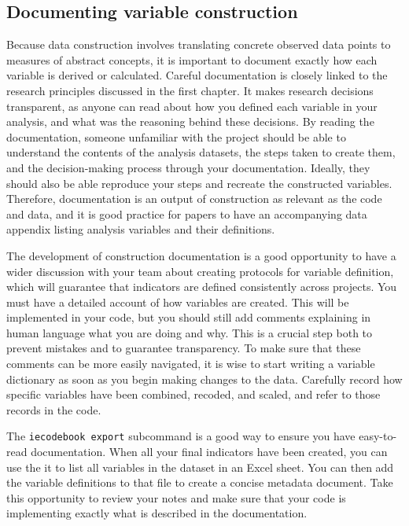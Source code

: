 \subsection{Documenting variable construction}

Because data construction involves translating concrete observed data points
to measures of abstract concepts,
it is important to document exactly how each variable is derived or calculated.
Careful documentation is closely linked to the research principles discussed in the first chapter.
It makes research decisions transparent,
as anyone can read about how you defined each variable in your analysis,
and what was the reasoning behind these decisions.
By reading the documentation,
someone unfamiliar with the project should be able to understand the contents of the analysis datasets,
the steps taken to create them, and the decision-making process through your documentation.
Ideally, they should also be able reproduce your steps and recreate the constructed variables.
Therefore, documentation is an output of construction as relevant as the code and data,
and it is good practice for papers to have an accompanying data appendix
listing analysis variables and their definitions.

The development of construction documentation is a good opportunity to have
a wider discussion with your team about creating protocols for variable definition,
which will guarantee that indicators are defined consistently across projects.
You must have a detailed account of how variables are created.
This will be implemented in your code, but you should still
add comments explaining in human language what you are doing and why.
This is a crucial step both to prevent mistakes and to guarantee transparency.
To make sure that these comments can be more easily navigated,
it is wise to start writing a variable dictionary as soon as you begin making changes to the data.
Carefully record how specific variables have been combined, recoded, and scaled,
and refer to those records in the code.

The \texttt{iecodebook export} subcommand is
a good way to ensure you have easy-to-read documentation.
When all your final indicators have been created,
you can use the it to list all variables in the dataset in an Excel sheet.
You can then add the variable definitions to that file to create a concise metadata document.
Take this opportunity to review your notes and make sure that your code
is implementing exactly what is described in the documentation.

